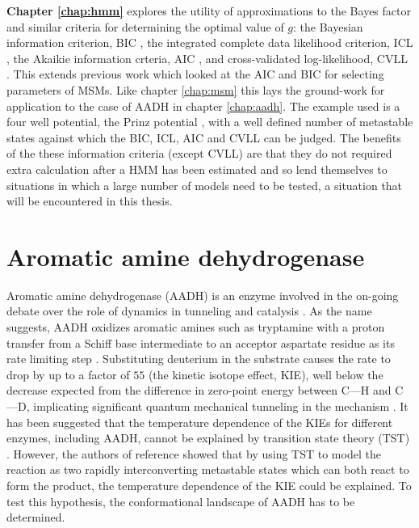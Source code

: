 \textbf{Chapter \ref{chap:hmm}} explores the utility of approximations to the Bayes factor and similar criteria for determining the optimal value of $g$: the Bayesian information criterion, BIC \cite{schwarzEstimatingDimensionModel1978a}, the integrated complete data likelihood criterion, ICL \cite{biernackiAssessingMixtureModel2000a}, the Akaikie information crteria, AIC \cite{akaikeInformationTheoryExtension1998}, and cross-validated log-likelihood, CVLL \cite{celeuxSelectingHiddenMarkov2008}. This extends previous work \cite{mcgibbonStatisticalModelSelection2014a} which looked at the AIC and BIC for selecting parameters of MSMs. Like chapter \ref{chap:msm} this lays the ground-work for application to the case of AADH in chapter \ref{chap:aadh}. The example used is a four well potential, the Prinz potential \cite{prinzMarkovModelsMolecular2011}, with a well defined number of metastable states against which the BIC, ICL, AIC and CVLL can be judged. The benefits of the these information criteria (except CVLL) are that they do not required extra calculation after a HMM has been estimated and so lend themselves to situations in which a large number of models need to be tested, a situation that will be encountered in this thesis. 

\section{Aromatic amine dehydrogenase}
Aromatic amine dehydrogenase (AADH) is an enzyme involved in the on-going debate over the role of dynamics in tunneling and catalysis \cite{glowackiTakingOckhamRazor2012b,glowackiProteinDynamicsEnzyme2012a,mcgeaghProteinDynamicsEnzyme2011}. As the name suggests, AADH oxidizes aromatic amines such as tryptamine with a proton transfer from a Schiff base intermediate to an acceptor aspartate residue as its rate limiting step \cite{masgrauAtomicDescriptionEnzyme2006}.  Substituting deuterium in the substrate causes the rate to drop by up to a factor of $55$ (the kinetic isotope effect, KIE), well below the decrease expected from the difference in zero-point energy between C---H and C---D, implicating significant quantum mechanical tunneling in the mechanism \cite{masgrauAtomicDescriptionEnzyme2006, klinmanbeyond2009}. It has been suggested that the temperature dependence of the KIEs for different enzymes, including AADH, cannot be explained by transition state theory (TST) \cite{agrawalVibrationallyEnhancedHydrogen2004,kohenEnzymeCatalysisClassical1998}. However, the authors of reference \cite{glowackiProteinDynamicsEnzyme2012a} showed that by using TST to model the reaction as two rapidly interconverting metastable states which can both react to form the product, the temperature dependence of the KIE could be explained. To test this hypothesis, the conformational landscape of AADH has to be determined. 

